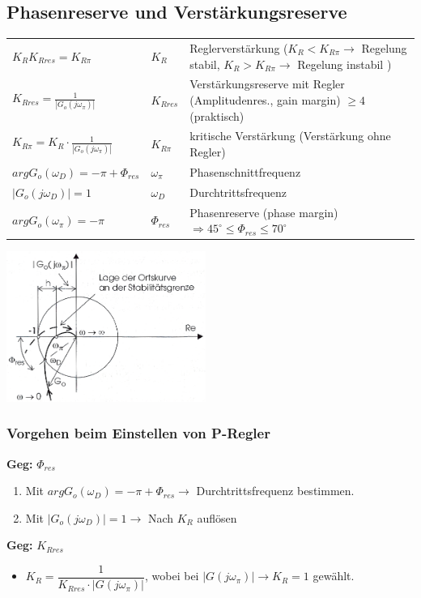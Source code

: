 		
	\subsection{Phasenreserve und Verstärkungsreserve }
		\begin{tabular}{l|ll}
			$K_RK_{Rres}=K_{R\pi}$ & $K_R$ & Reglerverstärkung ($K_R < K_{R\pi} \rightarrow$ Regelung stabil, $K_R > K_{R\pi} \rightarrow$ Regelung
			instabil	) \\
			$K_{Rres}=\frac{1}{\left| G_o(j\omega_{\pi})\right|}$ & $K_{Rres}$ & 	Verstärkungsreserve mit Regler (Amplitudenres., gain margin) $\geq 4$ (praktisch) \\
			$K_{R\pi} = K_R \cdot \frac{1}{|G_o(j\omega_\pi)|}$ & $K_{R\pi}$ & kritische Verstärkung (Verstärkung ohne Regler) \\
			$argG_o(\omega_D)=-\pi+\Phi_{res}$ & $\omega_\pi$ & Phasenschnittfrequenz\\
			$|G_o(j\omega_D)|=1$ & $\omega_D$ & Durchtrittsfrequenz \\
			$argG_o(\omega_\pi)=-\pi$ & $\Phi_{res}$ & Phasenreserve (phase margin) $\Rightarrow 45^{\circ} \leq \Phi_{res} \leq 70^{\circ}$
		\end{tabular}
		\begin{minipage}{7cm}
			\includegraphics[width=6.5cm]{./images/phasenreserve.png}
		\end{minipage}
		\begin{minipage}{11cm}
			\subsubsection{Vorgehen beim Einstellen von P-Regler}
			\textbf{Geg:} $\Phi_{res}$
			\begin{enumerate}
				\item Mit $argG_o(\omega_D) = -\pi + \Phi_{res} \rightarrow$ Durchtrittsfrequenz bestimmen.
				\item Mit $|G_o(j\omega_D)| = 1 \rightarrow$  Nach $K_{R}$ auflösen 
			\end{enumerate}
			\vspace{0.5cm}
			\textbf{Geg:} $K_{Rres}$
			\begin{itemize}
				\item $K_R = \dfrac{1}{K_{Rres} \cdot |G(j\omega_\pi)|}$, wobei bei $|G(j\omega_\pi)| \rightarrow K_R = 1$ gewählt.
			\end{itemize}
			
		\end{minipage}
        
